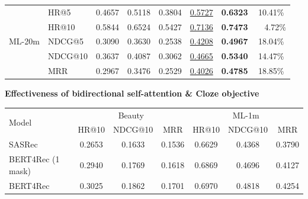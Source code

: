 \documentclass[25pt, a0paper, portrait, margin=0mm, innermargin=0pt, blockverticalspace=0mm, colspace=0mm, subcolspace=0mm]{tikzposter} %
\begin{document}
\begin{columns}
\begin{subcolumns}
{\begin{minipage}{0.9\linewidth}
\begin{center}
\begin{adjustbox}{max width=0.95\textwidth}
\begin{tabular}{l l c c c c c c}
         \midrule
         \multirow{5}{*}{ML-20m} & HR@5  & 0.4657 & 0.5118 & 0.3804 & \underline{0.5727} & \textbf{0.6323} & 10.41\%\\
         & HR@10 & 0.5844 & 0.6524 & 0.5427 & \underline{0.7136} & \textbf{0.7473} & ~~4.72\% \\
         & NDCG@5 & 0.3090 & 0.3630 & 0.2538 & \underline{0.4208} & \textbf{0.4967} & 18.04\%\\
         & NDCG@10 & 0.3637 & 	0.4087 & 0.3062 & \underline{0.4665} & \textbf{0.5340} & 14.47\% \\
         & MRR & 0.2967 & 0.3476 & 0.2529 & \underline{0.4026} & \textbf{0.4785} & 18.85\% \\
        \bottomrule
        \end{tabular}
        \end{adjustbox}
        \end{center}
        
        \vspace*{0.5cm}
        \normalsize
        \textbf{Effectiveness of bidirectional self-attention \& Cloze objective}
        \begin{center}
            \begin{adjustbox}{max width=0.95\linewidth}
    \begin{tabular}
        {l c c c c c c}
        \toprule
       \multirow{2}{*}{Model} & \multicolumn{3}{c}{Beauty} & \multicolumn{3}{c}{ML-1m} \\ \cmidrule(lr){2-4} \cmidrule(lr){5-7}
        & HR@10 & NDCG@10 & MRR & HR@10 & NDCG@10 & MRR \\ \midrule
        SASRec & 0.2653 & 0.1633 & 0.1536 & 0.6629 & 0.4368 & 0.3790 \\
        BERT4Rec (1 mask) & 0.2940 & 0.1769 & 0.1618 & 0.6869 & 0.4696 & 0.4127 \\
        BERT4Rec & 0.3025 & 0.1862 & 0.1701 & 0.6970 & 0.4818 & 0.4254 \\ 
        \bottomrule
    \end{tabular}
    \end{adjustbox}
        \end{center}
    
        \end{minipage}
        }
    \end{subcolumns}
    
    \block[linewidth=0pt, bodyverticalshift=-0.3cm]{}{
    
%    

}
\end{columns}
\end{document}
